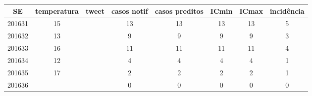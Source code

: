 \begin{tabular}{c|ccccccc}
  \hline
SE & temperatura & tweet & casos notif & casos preditos & ICmin & ICmax & incidência \\ 
  \hline
201631 & 15 &  & 13 & 13 & 13 & 13 & 5 \\ 
  201632 & 13 &  & 9 & 9 & 9 & 9 & 3 \\ 
  201633 & 16 &  & 11 & 11 & 11 & 11 & 4 \\ 
  201634 & 12 &  & 4 & 4 & 4 & 4 & 1 \\ 
  201635 & 17 &  & 2 & 2 & 2 & 2 & 1 \\ 
  201636 &  &  & 0 & 0 & 0 & 0 & 0 \\ 
   \hline
\end{tabular}
